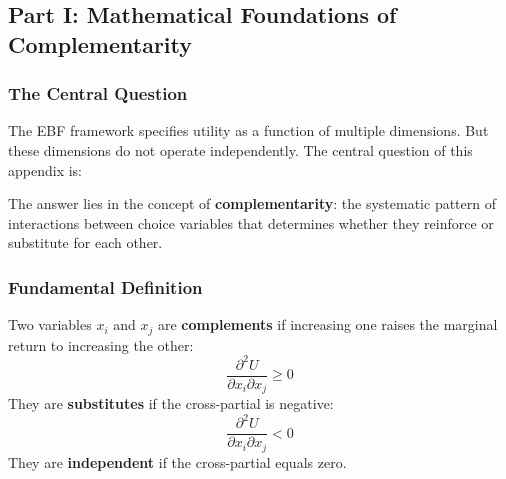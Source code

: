 
\subsection{Part I: Mathematical Foundations of Complementarity}
\label{sec:B-foundations}

\subsubsection{The Central Question}

The EBF framework specifies utility as a function of multiple dimensions.
But these dimensions do not operate independently. The central question of 
this appendix is:

\begin{center}
\end{center}

The answer lies in the concept of \textbf{complementarity}: the systematic 
pattern of interactions between choice variables that determines whether 
they reinforce or substitute for each other.

\subsubsection{Fundamental Definition}

\begin{definition}[Complementarity]
\label{def:complementarity}
Two variables $x_i$ and $x_j$ are \textbf{complements} if increasing one 
raises the marginal return to increasing the other:
\begin{equation}
    \frac{\partial^2 U}{\partial x_i \partial x_j} \geq 0
    \label{eq:complementarity-def}
\end{equation}
They are \textbf{substitutes} if the cross-partial is negative:
\begin{equation}
    \frac{\partial^2 U}{\partial x_i \partial x_j} < 0
    \label{eq:substitutes-def}
\end{equation}
They are \textbf{independent} if the cross-partial equals zero.
\end{definition}

